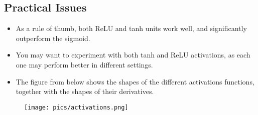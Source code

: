 \subsection{Practical Issues}
\begin{itemize}
\item As a rule of thumb, both ReLU and tanh units work well, and significantly outperform the sigmoid.
\item You may want to experiment with both tanh and ReLU activations, as each one may perform better in different settings.
\item The figure from below shows the shapes of the different activations functions, together with the shapes of their derivatives.
\end{itemize}
\begin{figure}[htb]
	\centering
	 \texttt{[image: pics/activations.png]}
\end{figure}





